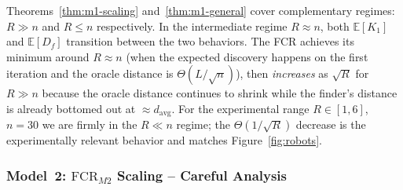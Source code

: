 \begin{remark}
Theorems~\ref{thm:m1-scaling} and~\ref{thm:m1-general} cover
complementary regimes: $R \gg n$ and $R \leq n$ respectively.
In the intermediate regime $R \approx n$, both $\mathbb{E}[K_1]$ and
$\mathbb{E}[D_f]$ transition between the two behaviors.
The FCR achieves its minimum around $R \approx n$ (when the expected
discovery happens on the first iteration and the oracle distance is
$\Theta(L/\sqrt{n})$), then \emph{increases} as $\sqrt{R}$ for $R \gg n$
because the oracle distance continues to shrink while the finder's
distance is already bottomed out at $\approx d_{\mathrm{avg}}$.
For the experimental range $R \in [1,6]$, $n=30$ we are firmly in the
$R \ll n$ regime; the $\Theta(1/\sqrt{R})$ decrease is the experimentally
relevant behavior and matches Figure~\ref{fig:robots}.
\end{remark}

\subsubsection{Model~2: \texorpdfstring{$\mathrm{FCR}_{M2}$}{FCR\_M2} Scaling -- Careful Analysis}

